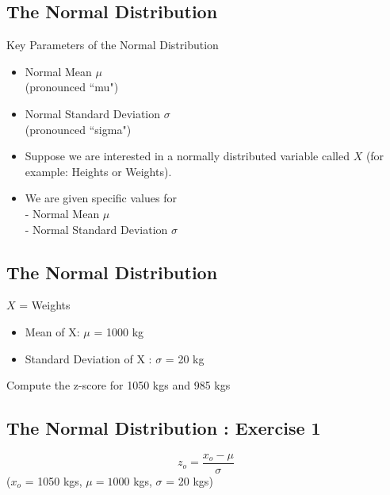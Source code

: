 \documentclass[]{report}
\begin{document}

\subsection{The Normal Distribution}

{
\normalsize
Key Parameters of the Normal Distribution
\begin{itemize}
\item Normal Mean $\mu$ \\(pronounced ``mu")
\item Normal Standard Deviation $\sigma$ \\ (pronounced ``sigma")
\end{itemize}

\begin{itemize}
\item Suppose we are interested in a normally distributed variable called $X$ (for example: Heights or Weights).
\item We are given specific values for 
\\  - Normal Mean $\mu$ 
\\  - Normal Standard Deviation $\sigma$ 
\end{itemize}
}





\subsection{The Normal Distribution}



$X$ = Weights
\bigskip
\begin{itemize}
\item Mean of X:  $\mu$ = 1000 kg 
\item Standard Deviation of X : $\sigma$ = 20 kg
\end{itemize}
\bigskip

Compute the z-score for 1050 kgs and 985 kgs



\subsection{The Normal Distribution :  Exercise 1}

\[ z_o = \frac{x_o - \mu}{\sigma}  \]
($x_o$ = 1050 kgs, $\mu = 1000$ kgs, $\sigma$ = 20 kgs)
\end{document}
